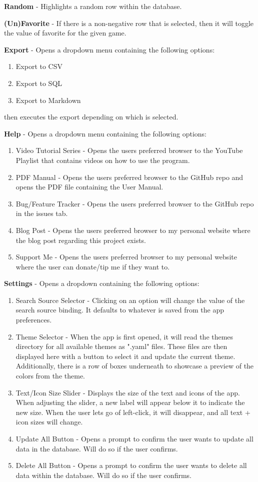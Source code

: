 \textbf{Random} - Highlights a random row within the database.

\textbf{(Un)Favorite} - If there is a non-negative row that is
selected, then it will toggle the value of favorite for the given game.

\textbf{Export} - Opens a dropdown menu containing the following options:
\begin{enumerate}
	\item Export to CSV
	\item Export to SQL
	\item Export to Markdown
\end{enumerate}
then executes the export depending on which is selected.

\textbf{Help} - Opens a dropdown menu containing the following options:
\begin{enumerate}
	\item Video Tutorial Series - Opens the users preferred browser to
		the YouTube Playlist that contains videos on how to use the program.
	\item PDF Manual - Opens the users preferred browser to the GitHub
		repo and opens the PDF file containing the User Manual.
	\item Bug/Feature Tracker - Opens the users preferred browser to the
		GitHub repo in the issues tab.
	\item Blog Post - Opens the users preferred browser to my personal
		website where the blog post regarding this project exists.
	\item Support Me - Opens the users preferred browser to my personal
		website where the user can donate/tip me if they want to.
\end{enumerate}

\textbf{Settings} - Opens a dropdown containing the following options:
\begin{enumerate}
	\item Search Source Selector - Clicking on an option will change the
		value of the search source binding. It defaults to whatever is
		saved from the app preferences.
	\item Theme Selector - When the app is first opened, it will read
		the themes directory for all available themes as ".yaml" files.
		These files are then displayed here with a button to select it and
		update the current theme. Additionally, there is a row of boxes underneath to
		showcase a preview of the colors from the theme.
	\item Text/Icon Size Slider - Displays the size of the text and icons
		of the app. When adjusting the slider, a new label will appear
		below it to indicate the new size. When the user lets go of
		left-click, it will disappear, and all text + icon sizes will change.
	\item Update All Button - Opens a prompt to confirm the user wants
		to update all data in the database. Will do so if the user confirms.
	\item Delete All Button - Opens a prompt to confirm the user wants
		to delete all data within the database. Will do so if the user confirms.
\end{enumerate}

